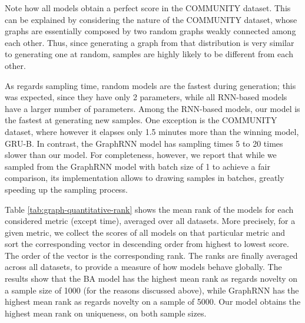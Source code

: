 Note how all models obtain a perfect score in the COMMUNITY dataset. This can be explained by considering the nature of the COMMUNITY dataset, whose graphs are essentially composed by two random graphs weakly connected among each other. Thus, since generating a graph from that distribution is very similar to generating one at random, samples are highly likely to be different from each other.

As regards sampling time, random models are the fastest during generation; this was expected, since they have only 2 parameters, while all RNN-based models have a larger number of parameters. Among the RNN-based models, our model is the fastest at generating new samples. One exception is the COMMUNITY dataset, where however it elapses only 1.5 minutes more than the winning model, GRU-B. In contrast, the GraphRNN model has sampling times 5 to 20 times slower than our model. For completeness, however, we report that while we sampled from the GraphRNN model with batch size of 1 to achieve a fair comparison, its implementation allows to drawing samples in batches, greatly speeding up the sampling process.

Table \ref{tab:graph-quantitative-rank} shows the mean rank of the models for each considered metric (except time), averaged over all datasets. More precisely, for a given metric, we collect the scores of all models on that particular metric and sort the corresponding vector in descending order from highest to lowest score. The order of the vector is the corresponding rank. The ranks are finally averaged across all datasets, to provide a measure of how models behave globally. The results show that the BA model has the highest mean rank as regards novelty on a sample size of 1000 (for the reasons discussed above), while GraphRNN has the highest mean rank as regards novelty on a sample of 5000. Our model obtains the highest mean rank on uniqueness, on both sample sizes.


